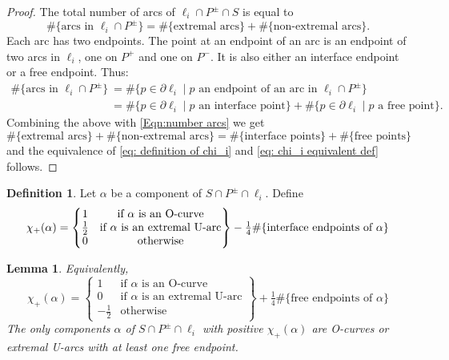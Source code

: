 \documentclass[12pt,reqno]{amsart}
\theoremstyle{plain}
\newtheorem{lemma}[theorem]{Lemma}
\theoremstyle{definition}
\newtheorem{definition}[theorem]{Definition}
\newcommand{\bdy}{\partial}
\begin{document}
\begin{proof}
The total number of arcs of $\ell_i \cap P^{\pm} \cap S$ is equal to 
\begin{equation}\label{Eqn:number arcs}
\#\{\text{arcs in }\ell_i\cap P^{\pm}\} = \#\{\text{extremal arcs}\}+\#\{\text{non-extremal arcs}\}.
\end{equation}
Each arc has two endpoints.
The point at an endpoint of an arc is an endpoint of two arcs in $\ell_i$, one on $P^+$ and 
one on $P^-$. It is also either an interface endpoint or a free endpoint. Thus:
\begin{align*}
\#\{\text{arcs in }\ell_i\cap P^{\pm}\} &= 
\#\{p \in \bdy \ell_i \mid p \text{ an endpoint of an arc in }\ell_i\cap P^{\pm}\} \\
&= \#\{p \in \bdy\ell_i \mid p\text{ an interface point}\} + \#\{p \in \bdy\ell_i \mid p
\text{ a free point}\}.
\end{align*}
Combining the above with \cref{Eqn:number arcs} we get
\[\#\{\text{extremal arcs}\}+\#\{\text{non-extremal arcs}\} = 
\#\{\text{interface points}\} + \#\{\text{free points}\}\]
and the equivalence of \eqref{eq: definition of chi_i} and 
\eqref{eq: chi_i equivalent def} follows.
\end{proof}

\begin{definition}
Let $\alpha$ be a component of $S\cap P^\pm\cap \ell_i$. Define 
\begin{equation}
\chi_+(\alpha) = \begin{Bmatrix}
    1 & \text{if }\alpha\text{ is an O-curve}\\
    \tfrac12 & \text{if }\alpha\text{ is an extremal U-arc}\\
    0 & \text{otherwise}
\end{Bmatrix} - \tfrac14\#\{\text{interface endpoints of }\alpha\}\\
\end{equation}
\end{definition}

\begin{lemma}\label{Lem:ChiPlusFormula}
Equivalently,
\begin{equation}
    \chi_+(\alpha)=\begin{Bmatrix}
    1 & \text{if }\alpha\text{ is an O-curve}\\
    0 & \text{if }\alpha\text{ is an extremal U-arc}\\
    -\tfrac12 & \text{otherwise}
    \end{Bmatrix} + \tfrac14\#\{\text{free endpoints of }\alpha\}
\end{equation}
The only components $\alpha$ of $S\cap P^{\pm}\cap \ell_i$ with positive 
$\chi_+(\alpha)$ are O-curves or extremal U-arcs with at least one free endpoint.
\end{lemma}
\end{document}
